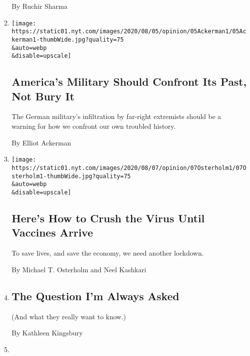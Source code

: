 \begin{enumerate}
  By Ruchir Sharma
\item
  \href{/2020/08/08/opinion/nazi-confederate-military-history-ksk.html}{}

  \texttt{[image: https://static01.nyt.com/images/2020/08/05/opinion/05Ackerman1/05Ackerman1-thumbWide.jpg?quality=75\\\&auto=webp\\\&disable=upscale]}

  \hypertarget{americas-military-should-confront-its-past-not-bury-it}{%
  \subsection{America's Military Should Confront Its Past, Not Bury
  It}\label{americas-military-should-confront-its-past-not-bury-it}}

  The German military's infiltration by far-right extremists should be a
  warning for how we confront our own troubled history.

  By Elliot Ackerman
\item
  \href{/2020/08/07/opinion/coronavirus-lockdown-unemployment-death.html}{}

  \texttt{[image: https://static01.nyt.com/images/2020/08/07/opinion/07Osterholm1/07Osterholm1-thumbWide.jpg?quality=75\\\&auto=webp\\\&disable=upscale]}

  \hypertarget{heres-how-to-crush-the-virus-until-vaccines-arrive}{%
  \subsection{Here's How to Crush the Virus Until Vaccines
  Arrive}\label{heres-how-to-crush-the-virus-until-vaccines-arrive}}

  To save lives, and save the economy, we need another lockdown.

  By Michael T. Osterholm and Neel Kashkari
\item
  \href{/2020/08/07/opinion/the-question-im-always-asked.html}{}

  \hypertarget{the-question-im-always-asked}{%
  \subsection{The Question I'm Always
  Asked}\label{the-question-im-always-asked}}

  (And what they really want to know.)

  By Kathleen Kingsbury
\item
  \href{/2020/08/07/opinion/trump-2020-census.html}{}


\end{enumerate}
